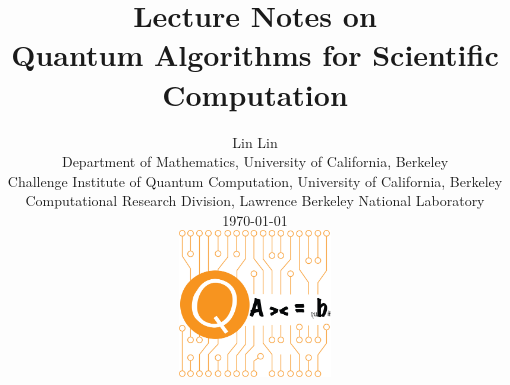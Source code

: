\documentclass{amsbook}
\begin{document}
\title{
{\huge{Lecture Notes on \\
Quantum Algorithms for Scientific Computation}}}
\author{\vspace{5em}
{\huge Lin Lin}\\
\vspace{2em}
{
\Large
Department of Mathematics, University of California, Berkeley\\
Challenge Institute of Quantum Computation, University of California, Berkeley\\
Computational Research Division, Lawrence Berkeley National Laboratory\\
}
\vspace{5em}
\today
\vspace{5em}
\begin{center}
\includegraphics[width=0.3\textwidth]{QNLA-sq2}
\end{center}

}
\maketitle

\tableofcontents


 

 

% 

 

 

% 



%



%



% 
\end{document}

